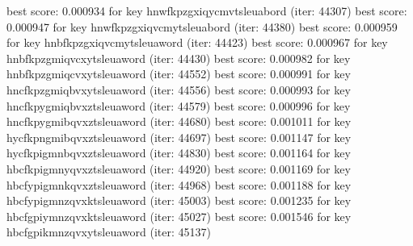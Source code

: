 \documentclass[]{article}
\begin{document}
best score: 0.000934 for key hnwfkpzgxiqycmvtsleuabord (iter: 44307)
best score: 0.000947 for key hnwfkpzgxiqvcmytsleuabord (iter: 44380)
best score: 0.000959 for key hnbfkpzgxiqvcmytsleuaword (iter: 44423)
best score: 0.000967 for key hnbfkpzgmiqvcxytsleuaword (iter: 44430)
best score: 0.000982 for key hnbfkpzgmiqcvxytsleuaword (iter: 44552)
best score: 0.000991 for key hncfkpzgmiqbvxytsleuaword (iter: 44556)
best score: 0.000993 for key hncfkpygmiqbvxztsleuaword (iter: 44579)
best score: 0.000996 for key hncfkpygmibqvxztsleuaword (iter: 44680)
best score: 0.001011 for key hycfkpngmibqvxztsleuaword (iter: 44697)
best score: 0.001147 for key hycfkpigmnbqvxztsleuaword (iter: 44830)
best score: 0.001164 for key hbcfkpigmnyqvxztsleuaword (iter: 44920)
best score: 0.001169 for key hbcfypigmnkqvxztsleuaword (iter: 44968)
best score: 0.001188 for key hbcfypigmnzqvxktsleuaword (iter: 45003)
best score: 0.001235 for key hbcfgpiymnzqvxktsleuaword (iter: 45027)
best score: 0.001546 for key hbcfgpikmnzqvxytsleuaword (iter: 45137)
\end{document}
